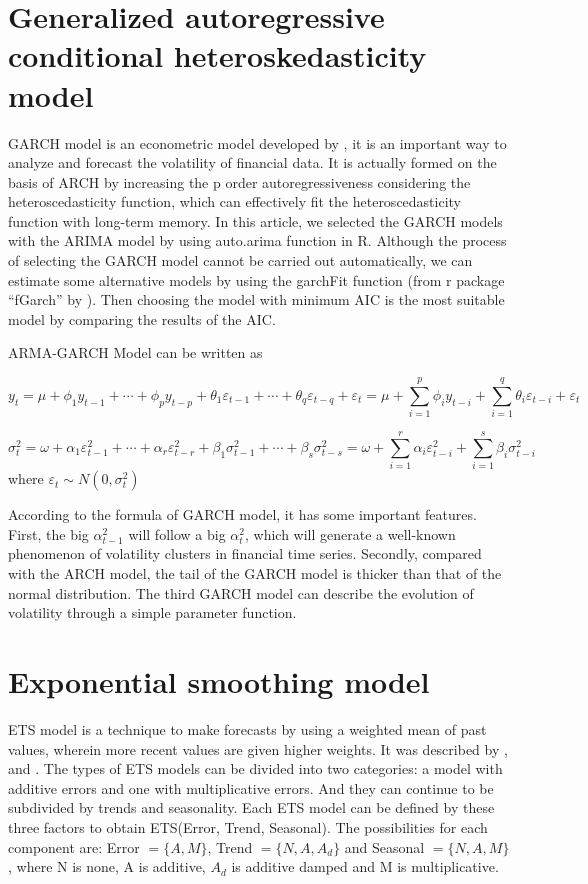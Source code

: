 \documentclass{monashthesis}
\theoremstyle{definition}
\theoremstyle{definition}
\theoremstyle{definition}
\theoremstyle{remark}
\begin{document}
\section{Generalized autoregressive conditional heteroskedasticity
model}\label{generalized-autoregressive-conditional-heteroskedasticity-model}

GARCH model is an econometric model developed by \textcite{R86}, it is
an important way to analyze and forecast the volatility of financial
data. It is actually formed on the basis of ARCH by increasing the p
order autoregressiveness considering the heteroscedasticity function,
which can effectively fit the heteroscedasticity function with long-term
memory. In this article, we selected the GARCH models with the ARIMA
model by using auto.arima function in R. Although the process of
selecting the GARCH model cannot be carried out automatically, we can
estimate some alternative models by using the garchFit function (from r
package ``fGarch'' by \textcite{WD17}). Then choosing the model with
minimum AIC is the most suitable model by comparing the results of the
AIC.

ARMA-GARCH Model can be written as

\[y_t=\mu+\phi_1y_{t-1}+\cdots+\phi_py_{t-p}+\theta_1\varepsilon_{t-1}+\cdots+\theta_q\varepsilon_{t-q}+\varepsilon_t=\mu+\sum_{i=1}^p\phi_iy_{t-i}+\sum_{i=1}^q\theta_i\varepsilon_{t-i}+\varepsilon_t\]

\[\sigma_t^2=\omega+\alpha_1\varepsilon_{t-1}^2+\cdots+\alpha_r\varepsilon_{t-r}^2+\beta_1\sigma_{t-1}^2+\cdots+\beta_s\sigma_{t-s}^2=\omega+\sum_{i=1}^r\alpha_i\varepsilon_{t-i}^2+\sum_{i=1}^s\beta_i\sigma_{t-i}^2\]
where \(\varepsilon_t\sim{N(0,\sigma_t^2)}\)

According to the formula of GARCH model, it has some important features.
First, the big \(\alpha_{t-1}^2\) will follow a big \(\alpha_t^2\),
which will generate a well-known phenomenon of volatility clusters in
financial time series. Secondly, compared with the ARCH model, the tail
of the GARCH model is thicker than that of the normal distribution. The
third GARCH model can describe the evolution of volatility through a
simple parameter function.

\section{Exponential smoothing model}\label{exponential-smoothing-model}

ETS model is a technique to make forecasts by using a weighted mean of
past values, wherein more recent values are given higher weights. It was
described by \textcite{B59}, \textcite{H57} and \textcite{W60}. The
types of ETS models can be divided into two categories: a model with
additive errors and one with multiplicative errors. And they can
continue to be subdivided by trends and seasonality. Each ETS model can
be defined by these three factors to obtain ETS(Error, Trend, Seasonal).
The possibilities for each component are: Error \(=\{A,M\}\), Trend
\(=\{N,A,A_d\}\) and Seasonal \(=\{N,A,M\}\), where N is none, A is
additive, \(A_d\) is additive damped and M is multiplicative.
\end{document}
